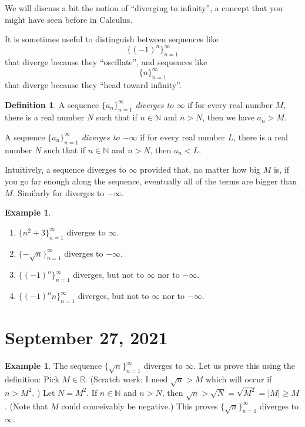 \documentclass[12pt]{amsart}
\newcommand{\R}{{\mathbb{R}}}
\newcommand{\N}{\mathbb{N}}
\numberwithin{equation}{section}
\theoremstyle{plain} %
\newcommand{\Sept}[1]{\section{September #1, 2021}}
\theoremstyle{definition}
\newtheorem{defn}[equation]{Definition}
\newtheorem{ex}[equation]{Example}
\theoremstyle{remark}
\begin{document}
We will discuss a bit the notion of ``diverging to infinity'', a concept that you might have seen before in Calculus. 

It is sometimes useful to distinguish between sequences like 
$$
\{(-1)^n\}_{n=1}^\infty
$$
that diverge because they ``oscillate'', and sequences like
$$
\{n\}_{n=1}^\infty
$$
that diverge because they ``head toward infinity''.


\begin{defn} A sequence $\{a_n\}_{n=1}^\infty$ {\em diverges to $\infty$} if for every real number $M$, there is a real number $N$ such that if $n \in \N$ and  $n > N$,
	then  we have $a_n > M$.
	
	
	A sequence $\{a_n\}_{n=1}^\infty$ {\em diverges to $-\infty$} if for every real number $L$, there is a real number $N$ such that if $n \in \N$ and $n > N$,
	then $a_n < L$. 
\end{defn}

Intuitively, a sequence diverges to $\infty$ provided that, no matter how big $M$ is, if you go far enough along the sequence, eventually all of the terms are
bigger than $M$. Similarly for diverges to $-\infty$.


\begin{ex} \begin{enumerate}
\item $\{ n^2+3\}_{n=1}^\infty$ diverges to $\infty$.
\item $\{ -\sqrt{n} \}_{n=1}^\infty$ diverges to $-\infty$.
\item $\{ (-1)^n\}_{n=1}^\infty$ diverges, but not to $\infty$ nor to $-\infty$.
\item $\{(-1)^n n\}_{n=1}^\infty$ diverges, but not to $\infty$ nor to $-\infty$.
\end{enumerate}
\end{ex}



\Sept{27}


\begin{ex} The sequence $\{\sqrt{n}\}_{n=1}^\infty$ diverges to $\infty$. Let us prove this using the definition: Pick $M \in \R$. 
	(Scratch work: I need $\sqrt{n} > M$ which will occur if $n > M^2$. )
	Let $N = M^2$. 
	If $n \in \N$ and $n > N$, then $\sqrt{n} > \sqrt{N} = \sqrt{M^2} = |M| \geq M$. (Note that $M$ could conceivably be negative.)
	This proves $\{\sqrt{n}\}_{n=1}^\infty$ diverges to $\infty$.
\end{ex}
\end{document}
